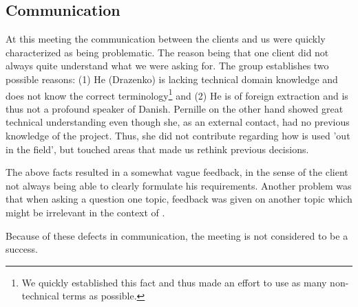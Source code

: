 \subsection{Communication}
At this meeting the communication between the clients and us were quickly characterized as being problematic.
The reason being that one client did not always quite understand what we were asking for.
The group establishes two possible reasons:
(1) He (Drazenko) is lacking technical domain knowledge and does not know the correct terminology\footnote{We quickly established this fact and thus made an effort to use as many non-technical terms as possible.} and (2) He is of foreign extraction and is thus not a profound speaker of Danish.
Pernille on the other hand showed great technical understanding even though she, as an external contact, had no previous knowledge of the \giraf project.
Thus, she did not contribute regarding how \giraf is used 'out in the field', but touched areas that made us rethink previous decisions.

The above facts resulted in a somewhat vague feedback, in the sense of the client not always being able to clearly formulate his requirements.
Another problem was that when asking a question one topic, feedback was given on another topic which might be irrelevant in the context of \launcher.

Because of these defects in communication, the meeting is not considered to be a success.